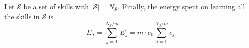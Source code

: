 Let $\mathcal{S}$ be a set of skills with $|\mathcal{S}| = N_\mathcal{S}$. Finally, the energy spent on learning all the skills in $\mathcal{S}$ is %
\begin{equation}\label{eq:total_energy}
    E_{\mathcal{S}} = \sum_{j=1}^{{N_{\mathcal{S}}}/{m}} E_j = m \cdot e_0 \sum_{j=1}^{{N_{\mathcal{S}}}/{m}} c_j%
\end{equation}

